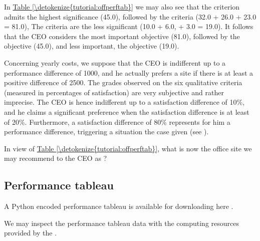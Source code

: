 \documentclass[a4paper,12pt,english]{sphinxhowto}
\begin{document}
In \hyperref[\detokenize{tutorial:offperftab}]{Table \ref{\detokenize{tutorial:offperftab}}} we may also see that the  criterion admits the highest significance (45.0), followed by the  criteria (32.0 + 26.0 + 23.0 = 81.0), The  criteria are the less significant (10.0 + 6.0, + 3.0 = 19.0). It follows that the CEO considers  the most important objective (81.0), followed by the  objective (45.0), and less important, the  objective (19.0).

Concerning yearly costs, we suppose that the CEO is indifferent up to a performance difference of 1000\texteuro{}, and he actually prefers a site if there is at least a positive difference of 2500\texteuro{}. The grades observed on the six qualitative criteria (measured in percentages of satisfaction) are very subjective and rather imprecise. The CEO is hence indifferent up to a satisfaction difference of 10\%, and he claims a significant preference when the satisfaction difference is at least of 20\%.  Furthermore, a satisfaction difference of 80\% represents for him a  performance difference, triggering a  situation the case given (see ).

In view of \hyperref[\detokenize{tutorial:offperftab}]{Table \ref{\detokenize{tutorial:offperftab}}}, what is now the office site we may recommend to the CEO as  ?


\subsection{Performance tableau}
\label{\detokenize{tutorial:performance-tableau}}
A Python encoded  performance tableau is available for downloading here .
\begin{quote}
\end{quote}

We may inspect the performance tableau data with the computing resources provided by the .
\end{document}
